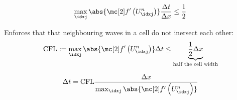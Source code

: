 \begin{defnbox}\nospacing
    \begin{defn}\label{defn:cfl_condition}\leavevmode\\
        \begin{minipage}[t]{0.5\textwidth}
            \begin{align}
              \max_{\idxj}\abs{\flux' \left(U_{\idxj}^{n}\right)}\frac{\Delta t}{\Delta x}\leq\frac{1}{2}\label{eq:cfl_condition}
            \end{align}
        \end{minipage}
        \begin{minipage}{0.45\textwidth}
            \begin{figure}[H]
                \centering{
                  \def\svgwidth{100pt}
                  \resizebox{\linewidth}{!}{}
                }
            \end{figure}
        \end{minipage}
    \end{defn}
\end{defnbox}
\begin{explanationbox}\nospacing
    \begin{explanation}
       Enforces that that neighbouring waves in a cell do not inersect each other:
        \begin{align}
          \text{\normalfont{CFL}}:=\max_{\idxj}\abs{\flux' \left(U_{\idxj}^{n}\right)}\Delta t\leq\underbrace{\frac{1}{2}\Delta x}_{\text{half the cell width}}
          \label{eq:cfl_number}
        \end{align}
    \end{explanation}
\end{explanationbox}
\begin{corbox}\nospacing
    \begin{cor}\label{cor:the_cfl_condition_can_be_used_to_calculate}
        \begin{align}
              \Delta t=\text{CFL}\frac{\Delta x}{\max_{\idxj}\abs{\flux' \left(U_{\idxj}^{n}\right)}}
        \end{align}
    \end{cor}
\end{corbox}

